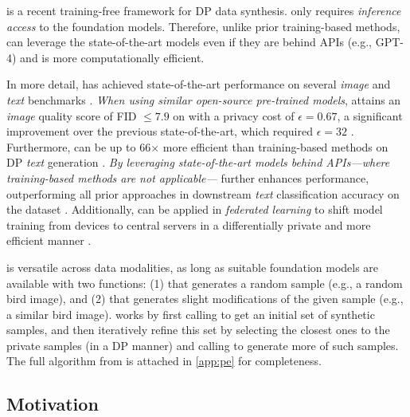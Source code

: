 \myparatightestn{\privateevolution{} (\pe{})} \cite{lin2023differentially,xie2024differentially} is a recent training-free framework for DP data synthesis. \pe{} only requires \emph{inference access} to the foundation models. Therefore, unlike prior training-based methods, \pe{} can leverage the state-of-the-art models even if they are behind APIs (e.g., GPT-4) and is more computationally efficient. 

In more detail, \pe{} has achieved state-of-the-art performance on several \emph{image} and \emph{text} benchmarks \cite{lin2023differentially,xie2024differentially}.  
\emph{When using similar open-source pre-trained models}, \pe{} attains an \emph{image} quality score of FID $\leq 7.9$ on \cifar{} with a privacy cost of $\epsilon=0.67$,  
a significant improvement over the previous state-of-the-art, which required $\epsilon=32$ \cite{lin2023differentially}.  
Furthermore, \pe{} can be up to 66$\times$ more efficient than training-based methods on DP \emph{text} generation \cite{xie2024differentially}.  
\emph{By leveraging state-of-the-art models behind APIs---where training-based methods are not applicable---}\pe{} further enhances performance,  
outperforming all prior approaches in downstream \emph{text} classification accuracy on the \openreview{} dataset \cite{xie2024differentially}.  
Additionally, \pe{} can be applied in \emph{federated learning} to shift model training from devices to central servers in a differentially private and more efficient manner \cite{hou2024pre,zou2025contrastive}.  

\pe{} is versatile across data modalities, as long as suitable foundation models are available with two functions: (1) \randomsampleapiname{} that generates a random sample (e.g., a random bird image), and (2) \samplevariationapiname{} that generates slight modifications of the given sample (e.g., a similar bird image). \pe{} works by first calling \randomsampleapiname{}  to get an initial set of synthetic samples, and then iteratively refine this set by selecting the closest ones to the private samples (in a DP manner) and calling \samplevariationapiname{} to generate more of such samples. The full \pe{} algorithm from \citet{lin2023differentially} is attached in \cref{app:pe} for completeness.

\subsection{Motivation}

